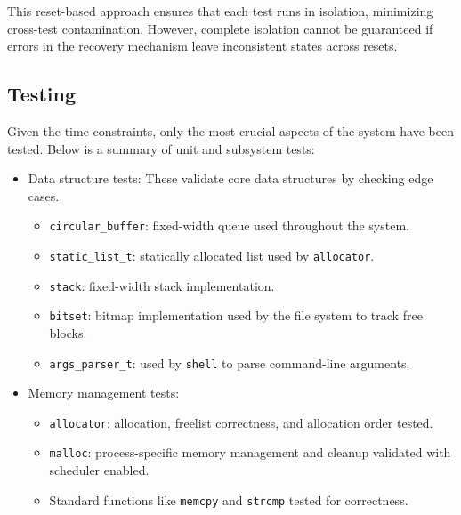 This reset-based approach ensures that each test runs in isolation, minimizing
cross-test contamination. However, complete isolation cannot be guaranteed if errors in
the recovery mechanism leave inconsistent states across resets.


\subsection{Testing}

Given the time constraints, only the most crucial aspects of the system have been
tested. Below is a summary of unit and subsystem tests:

\ifsubmission\newpage\fi
\begin{itemize}
    \item Data structure tests: These validate core data structures by checking edge
        cases.
        \begin{itemize}
            \item \lstinline[style=myagc]|circular_buffer|: fixed-width queue used
                throughout the system.
            \item \lstinline[style=myagc]|static_list_t|: statically allocated list
            used by \lstinline[style=myagc]|allocator|.
            \item \lstinline[style=myagc]|stack|: fixed-width stack implementation.
            \item \lstinline[style=myagc]|bitset|: bitmap implementation used by the
                file system to track free blocks.
            \item \lstinline[style=myagc]|args_parser_t|: used by
                \lstinline[style=myagc]|shell| to parse command-line arguments.
        \end{itemize}

    \item Memory management tests:
        \begin{itemize}
            \item \lstinline[style=myagc]|allocator|: allocation, freelist correctness,
                and allocation order tested.
            \item \lstinline[style=myagc]|malloc|: process-specific memory management
                and cleanup validated with scheduler enabled.
            \item Standard functions like \lstinline[style=myagc]|memcpy| and
                \lstinline[style=myagc]|strcmp| tested for correctness.
        \end{itemize}


\end{itemize}
